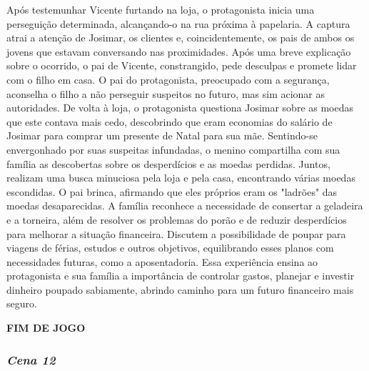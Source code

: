 Após testemunhar Vicente furtando na loja, o protagonista inicia uma perseguição determinada, alcançando-o na rua próxima à papelaria. A captura atrai a atenção de Josimar, os clientes e, coincidentemente, os pais de ambos os jovens que estavam conversando nas proximidades. Após uma breve explicação sobre o ocorrido, o pai de Vicente, constrangido, pede desculpas e promete lidar com o filho em casa. O pai do protagonista, preocupado com a segurança, aconselha o filho a não perseguir suspeitos no futuro, mas sim acionar as autoridades. De volta à loja, o protagonista questiona Josimar sobre as moedas que este contava mais cedo, descobrindo que eram economias do salário de Josimar para comprar um presente de Natal para sua mãe. Sentindo-se envergonhado por suas suspeitas infundadas, o menino compartilha com sua família as descobertas sobre os desperdícios e as moedas perdidas. Juntos, realizam uma busca minuciosa pela loja e pela casa, encontrando várias moedas escondidas. O pai brinca, afirmando que eles próprios eram os "ladrões" das moedas desaparecidas. A família reconhece a necessidade de consertar a geladeira e a torneira, além de resolver os problemas do porão e de reduzir desperdícios para melhorar a situação financeira. Discutem a possibilidade de poupar para viagens de férias, estudos e outros objetivos, equilibrando esses planos com necessidades futuras, como a aposentadoria. Essa experiência ensina ao protagonista e sua família a importância de controlar gastos, planejar e investir dinheiro poupado sabiamente, abrindo caminho para um futuro financeiro mais seguro.

\textbf{FIM DE JOGO}


\bigskip\medskip

\subsubsection*{\textit{\textbf{Cena 12}}}

